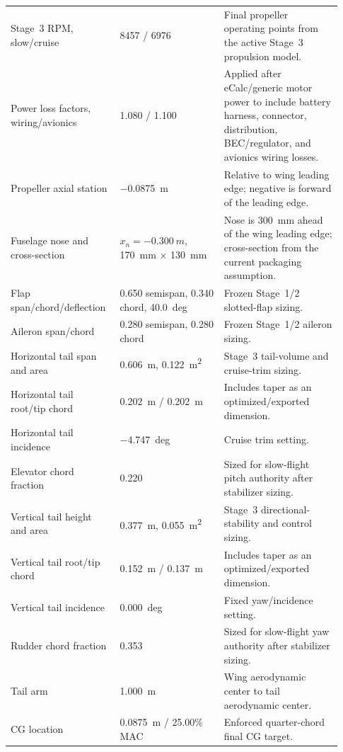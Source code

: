 \documentclass[11pt]{article}
\begin{document}
\begin{longtable}{@{}p{0.29\linewidth}p{0.30\linewidth}p{0.34\linewidth}@{}}
Stage~3 RPM, slow/cruise & \num{8457} / \num{6976} & Final propeller operating points from the active Stage~3 propulsion model. \\
Power loss factors, wiring/avionics & 1.080 / 1.100 & Applied after eCalc/generic motor power to include battery harness, connector, distribution, BEC/regulator, and avionics wiring losses. \\
Propeller axial station & \SI{-0.0875}{m} & Relative to wing leading edge; negative is forward of the leading edge. \\
Fuselage nose and cross-section & \(x_n=\SI{-0.300}{m}\), \SI{170}{mm} \(\times\) \SI{130}{mm} & Nose is 300~mm ahead of the wing leading edge; cross-section from the current packaging assumption. \\
Flap span/chord/deflection & 0.650 semispan, 0.340 chord, \SI{40.0}{deg} & Frozen Stage~1/2 slotted-flap sizing. \\
Aileron span/chord & 0.280 semispan, 0.280 chord & Frozen Stage~1/2 aileron sizing. \\
Horizontal tail span and area & \SI{0.606}{m}, \SI{0.122}{m^2} & Stage~3 tail-volume and cruise-trim sizing. \\
Horizontal tail root/tip chord & \SI{0.202}{m} / \SI{0.202}{m} & Includes taper as an optimized/exported dimension. \\
Horizontal tail incidence & \SI{-4.747}{deg} & Cruise trim setting. \\
Elevator chord fraction & 0.220 & Sized for slow-flight pitch authority after stabilizer sizing. \\
Vertical tail height and area & \SI{0.377}{m}, \SI{0.055}{m^2} & Stage~3 directional-stability and control sizing. \\
Vertical tail root/tip chord & \SI{0.152}{m} / \SI{0.137}{m} & Includes taper as an optimized/exported dimension. \\
Vertical tail incidence & \SI{0.000}{deg} & Fixed yaw/incidence setting. \\
Rudder chord fraction & 0.353 & Sized for slow-flight yaw authority after stabilizer sizing. \\
Tail arm & \SI{1.000}{m} & Wing aerodynamic center to tail aerodynamic center. \\
CG location & \SI{0.0875}{m} / 25.00\% MAC & Enforced quarter-chord final CG target. \\
\bottomrule
\end{longtable}
\end{document}
